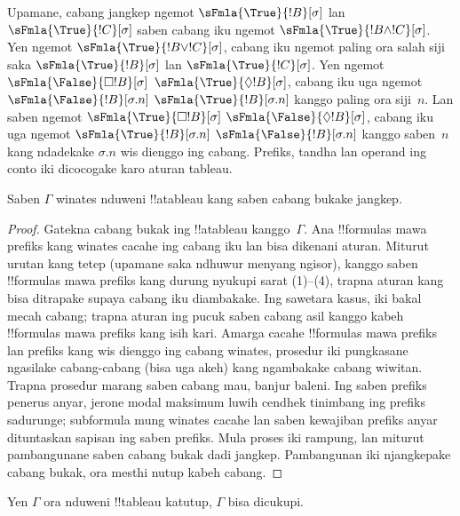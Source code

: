 \documentclass[../../../include/open-logic-section]{subfiles}
\begin{document}
\begin{explain}
Upamane, cabang jangkep ngemot $\sFmla{\True}{!B}[\sigma]$ lan
$\sFmla{\True}{!C}[\sigma]$ saben cabang iku ngemot $\sFmla{\True}{!B
  \land !C}[\sigma]$. Yen ngemot $\sFmla{\True}{!B \lor !C}[\sigma]$,
cabang iku ngemot paling ora salah siji saka $\sFmla{\True}{!B}[\sigma]$
lan $\sFmla{\True}{!C}[\sigma]$. Yen ngemot 
{$\sFmla{\False}{\Box !B}[\sigma]$} {$\sFmla{\True}{\Diamond !B}[\sigma]$},
cabang iku uga ngemot  {$\sFmla{\False}{!B}[\sigma.n]$}
{$\sFmla{\True}{!B}[\sigma.n]$} kanggo paling ora siji~$n$. Lan
saben ngemot  {$\sFmla{\True}{\Box !B}[\sigma]$}
{$\sFmla{\False}{\Diamond !B}[\sigma]$}, cabang iku uga ngemot 
{$\sFmla{\True}{!B}[\sigma.n]$}
{$\sFmla{\False}{!B}[\sigma.n]$} kanggo saben~$n$ kang ndadekake
$\sigma.n$ wis dienggo ing cabang.
Prefiks, tandha lan operand ing conto iki dicocogake karo aturan tableau.
\end{explain}

\begin{prop}
  Saben $\Gamma$ winates nduweni !!a{tableau} kang saben cabang bukake jangkep.
\end{prop}

\begin{proof}
  Gatekna cabang bukak ing !!a{tableau} kanggo~$\Gamma$. Ana
  !!{formula}s mawa prefiks kang winates cacahe ing cabang iku lan
  bisa dikenani aturan. Miturut urutan kang tetep (upamane saka
  ndhuwur menyang ngisor), kanggo saben !!{formula}s mawa prefiks
  kang durung nyukupi sarat (1)--(4), trapna aturan kang bisa
  ditrapake supaya cabang iku diambakake. Ing sawetara kasus, iki
  bakal mecah cabang; trapna aturan ing pucuk saben cabang asil kanggo
  kabeh !!{formula}s mawa prefiks kang isih kari. Amarga cacahe
  !!{formula}s mawa prefiks lan prefiks kang wis dienggo ing cabang
  winates, prosedur iki pungkasane ngasilake cabang-cabang (bisa uga
  akeh) kang ngambakake cabang wiwitan. Trapna prosedur marang saben
  cabang mau, banjur baleni. Ing saben prefiks penerus anyar, jerone modal maksimum luwih cendhek tinimbang ing prefiks sadurunge;
  subformula mung winates cacahe lan saben kewajiban prefiks anyar
  dituntaskan sapisan ing saben prefiks. Mula proses iki rampung, lan
  miturut pambangunane saben cabang bukak dadi jangkep.
Pambangunan iki njangkepake cabang bukak, ora mesthi nutup kabeh cabang.
\end{proof}

\begin{thm}[Kelengkapan]
  Yen $\Gamma$ ora nduweni !!{tableau} katutup, $\Gamma$ bisa dicukupi.
\end{thm}
\end{document}
